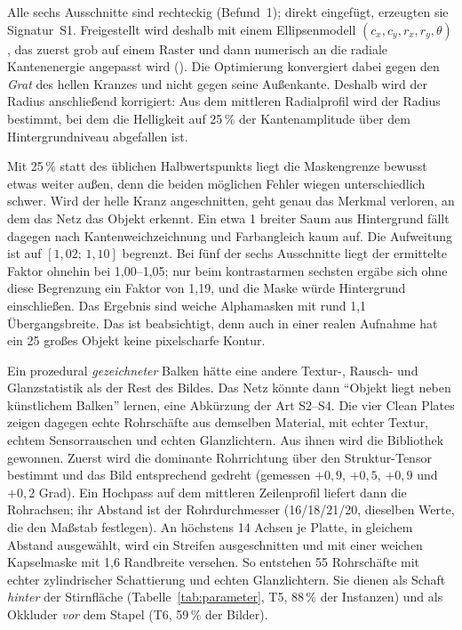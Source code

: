  Alle sechs Ausschnitte sind rechteckig
(Befund~1); direkt eingefügt, erzeugten sie Signatur~S1. Freigestellt wird
deshalb mit einem Ellipsenmodell $(c_x, c_y, r_x, r_y, \theta)$, das zuerst grob
auf einem Raster und dann numerisch an die radiale Kantenenergie angepasst wird
(). Die Optimierung konvergiert dabei gegen den \emph{Grat}
des hellen Kranzes und nicht gegen seine Außenkante. Deshalb wird der Radius
anschließend korrigiert: Aus dem mittleren Radialprofil wird der Radius
bestimmt, bei dem die Helligkeit auf 25\,\% der Kantenamplitude über dem
Hintergrundniveau abgefallen ist.

Mit 25\,\% statt des üblichen Halbwertspunkts \parencite{gonzalez2018} liegt
die Maskengrenze bewusst etwas weiter außen, denn die beiden möglichen Fehler
wiegen unterschiedlich schwer. Wird der helle Kranz angeschnitten, geht genau
das Merkmal verloren, an dem das Netz das Objekt erkennt. Ein etwa 1\px{}
breiter Saum aus Hintergrund fällt dagegen nach Kantenweichzeichnung und
Farbangleich kaum auf. Die Aufweitung ist auf $[1{,}02;\,1{,}10]$ begrenzt. Bei
fünf der sechs Ausschnitte liegt der ermittelte Faktor ohnehin bei 1,00--1,05;
nur beim kontrastarmen sechsten ergäbe sich ohne diese Begrenzung ein Faktor von
1,19, und die Maske würde Hintergrund einschließen. Das Ergebnis sind weiche Alphamasken mit rund
1,1\px{} Übergangsbreite. Das ist beabsichtigt, denn auch in einer realen Aufnahme
hat ein 25\px{} großes Objekt keine pixelscharfe Kontur.

 Ein prozedural \emph{gezeichneter} Balken hätte
eine andere Textur-, Rausch- und Glanzstatistik als der Rest des Bildes. Das
Netz könnte dann \enquote{Objekt liegt neben künstlichem Balken} lernen, eine
Abkürzung der Art S2--S4. Die vier Clean Plates zeigen dagegen echte
Rohrschäfte aus demselben Material, mit echter Textur, echtem Sensorrauschen und
echten Glanzlichtern. Aus ihnen wird die Bibliothek gewonnen. Zuerst wird die dominante
Rohrrichtung über den Struktur-Tensor bestimmt \parencite{jaehne2005} und das
Bild entsprechend gedreht (gemessen $+0{,}9$, $+0{,}5$, $+0{,}9$ und
$+0{,}2$ Grad). Ein Hochpass auf dem mittleren Zeilenprofil liefert dann die
Rohrachsen; ihr Abstand ist der Rohrdurchmesser (16/18/21/20\px, dieselben
Werte, die den Maßstab festlegen). An höchstens 14 Achsen je Platte, in
gleichem Abstand ausgewählt, wird ein Streifen ausgeschnitten und mit einer
weichen Kapselmaske mit 1,6\px{} Randbreite versehen. So entstehen 55
Rohrschäfte mit echter zylindrischer Schattierung und
echten Glanzlichtern. Sie dienen als Schaft \emph{hinter} der Stirnfläche
(Tabelle~\ref{tab:parameter}, T5, 88\,\% der Instanzen) und als Okkluder
\emph{vor} dem Stapel (T6, 59\,\% der Bilder).

